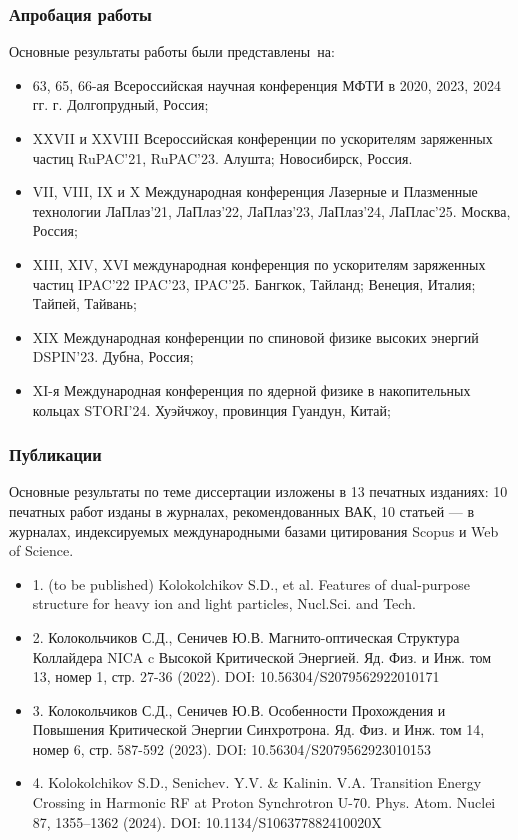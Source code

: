 \begin{frame}
	\frametitle{Апробация работы}
	Основные результаты работы были представлены~на:
	\small
	\begin{itemize}
		\item 63, 65, 66-ая Всероссийская научная конференция МФТИ в 2020, 2023, 2024 гг. г. Долгопрудный,
		Россия;
		\item XXVII и XXVIII Всероссийская конференции по ускорителям заряженных частиц RuPAC'21, RuPAC'23. Алушта; Новосибирск, Россия.
		\item VII, VIII, IX и X Международная конференция Лазерные и Плазменные технологии ЛаПлаз'21, ЛаПлаз'22, ЛаПлаз'23, ЛаПлаз'24, ЛаПлас'25. Москва, Россия;
		\item XIII, XIV, XVI международная конференция по ускорителям заряженных частиц IPAC'22 IPAC'23, IPAC'25. Бангкок, Тайланд; Венеция, Италия; Тайпей, Тайвань;
		\item XIX Международная конференции по спиновой физике высоких энергий DSPIN'23. Дубна, Россия;
		\item XI-я Международная конференция по ядерной физике в накопительных кольцах STORI’24. Хуэйчжоу, провинция Гуандун, Китай;
	\end{itemize}
\end{frame}
\begin{frame}
	\frametitle{Публикации}
	Основные результаты по теме диссертации изложены в 13 печатных
	изданиях: 10 печатных работ изданы в журналах, рекомендованных
	ВАК, 10 статьей — в журналах, индексируемых международными
	базами цитирования Scopus и Web of Science.
	\small
	\begin{itemize}
		\item	1. (to be published) Kolokolchikov S.D., et al. Features of dual-purpose structure for heavy ion and light particles, Nucl.Sci. and Tech.
		\item	2. Колокольчиков С.Д., Сеничев Ю.В. Магнито-оптическая Структура Коллайдера NICA c Высокой Критической Энергией. Яд. Физ. и Инж. том 13, номер 1, стр. 27-36 (2022). DOI: 10.56304/S2079562922010171
		\item	3. Колокольчиков С.Д., Сеничев Ю.В. Особенности Прохождения и Повышения Критической Энергии Синхротрона. Яд. Физ. и Инж. том 14, номер 6, стр. 587-592 (2023).  DOI: 10.56304/S2079562923010153
		\item	4. Kolokolchikov S.D., Senichev. Y.V. \& Kalinin. V.A. Transition Energy Crossing in Harmonic RF at Proton Synchrotron U-70. Phys. Atom. Nuclei 87, 1355–1362 (2024). DOI: 10.1134/S106377882410020X
	\end{itemize}
\end{frame}
